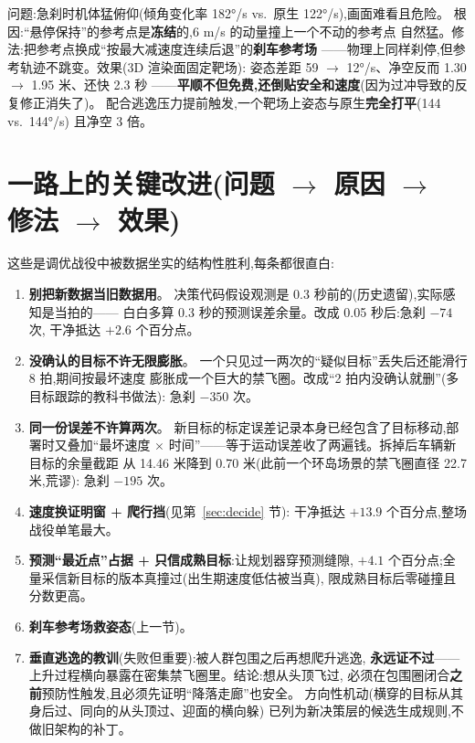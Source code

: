 \documentclass[11pt]{ctexart}
\begin{document}
问题:急刹时机体猛俯仰(倾角变化率 182°/s vs.\ 原生 122°/s),画面难看且危险。
根因:``悬停保持''的参考点是\textbf{冻结}的,6 m/s 的动量撞上一个不动的参考点
自然猛。修法:把参考点换成``按最大减速度连续后退''的\textbf{刹车参考场}
——物理上同样刹停,但参考轨迹不跳变。效果(3D 渲染面固定靶场):
姿态差距 59 $\to$ 12°/s、净空反而 1.30 $\to$ 1.95 米、还快 2.3 秒
——\textbf{平顺不但免费,还倒贴安全和速度}(因为过冲导致的反复修正消失了)。
配合逃逸压力提前触发,一个靶场上姿态与原生\textbf{完全打平}(144 vs.\ 144°/s)
且净空 3 倍。

\section{一路上的关键改进(问题 $\to$ 原因 $\to$ 修法 $\to$ 效果)}\label{sec:wins}

这些是调优战役中被数据坐实的结构性胜利,每条都很直白:

\begin{enumerate}
  \item \textbf{别把新数据当旧数据用}。
        决策代码假设观测是 0.3 秒前的(历史遗留),实际感知是当拍的——
        白白多算 0.3 秒的预测误差余量。改成 0.05 秒后:急刹 $-74$ 次,
        干净抵达 $+2.6$ 个百分点。
  \item \textbf{没确认的目标不许无限膨胀}。
        一个只见过一两次的``疑似目标''丢失后还能滑行 8 拍,期间按最坏速度
        膨胀成一个巨大的禁飞圈。改成``2 拍内没确认就删''(多目标跟踪的教科书做法):
        急刹 $-350$ 次。
  \item \textbf{同一份误差不许算两次}。
        新目标的标定误差记录本身已经包含了目标移动,部署时又叠加``最坏速度
        $\times$ 时间''——等于运动误差收了两遍钱。拆掉后车辆新目标的余量截距
        从 14.46 米降到 0.70 米(此前一个环岛场景的禁飞圈直径 22.7 米,荒谬):
        急刹 $-195$ 次。
  \item \textbf{速度换证明窗 + 爬行挡}(见第~\ref{sec:decide} 节):
        干净抵达 $+13.9$ 个百分点,整场战役单笔最大。
  \item \textbf{预测``最近点''占据 + 只信成熟目标}:让规划器穿预测缝隙,
        $+4.1$ 个百分点;全量采信新目标的版本真撞过(出生期速度低估被当真),
        限成熟目标后零碰撞且分数更高。
  \item \textbf{刹车参考场救姿态}(上一节)。
  \item \textbf{垂直逃逸的教训}(失败但重要):被人群包围之后再想爬升逃逸,
        \textbf{永远证不过}——上升过程横向暴露在密集禁飞圈里。结论:想从头顶飞过,
        必须在包围圈闭合\textbf{之前}预防性触发,且必须先证明``降落走廊''也安全。
        方向性机动(横穿的目标从其身后过、同向的从头顶过、迎面的横向躲)
        已列为新决策层的候选生成规则,不做旧架构的补丁。
\end{enumerate}
\end{document}
